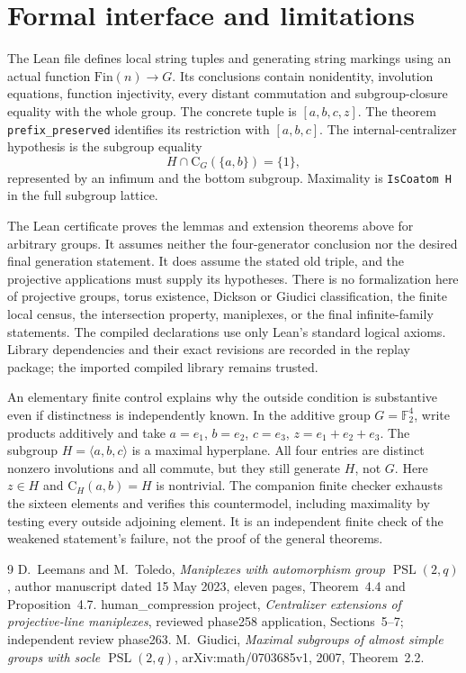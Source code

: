 \documentclass[11pt]{article}
\newcommand{\gen}[1]{\langle #1\rangle}
\newcommand{\CG}{\mathrm C}
\begin{document}
\section{Formal interface and limitations}
The Lean file defines local string tuples and generating string markings
using an actual function $\mathrm{Fin}(n)\to G$. Its conclusions contain
nonidentity, involution equations, function injectivity, every distant
commutation and subgroup-closure equality with the whole group.
The concrete tuple is $[a,b,c,z]$. The theorem
\texttt{prefix\_preserved} identifies its restriction with $[a,b,c]$.
The internal-centralizer hypothesis is the subgroup equality
\[
 H\cap \CG_G(\{a,b\})=\{1\},
\]
represented by an infimum and the bottom subgroup. Maximality is
\texttt{IsCoatom H} in the full subgroup lattice.

The Lean certificate proves the lemmas and extension theorems above
for arbitrary groups. It assumes neither the four-generator conclusion
nor the desired final generation statement. It does assume the stated
old triple, and the projective applications must supply its hypotheses.
There is no formalization here of projective groups, torus existence,
Dickson or Giudici classification, the finite local census, the
intersection property, maniplexes, or the final infinite-family
statements. The compiled declarations use only Lean's standard logical
axioms. Library dependencies and their exact revisions are recorded in
the replay package; the imported compiled library remains trusted.

An elementary finite control explains why the outside condition is
substantive even if distinctness is independently known. In the additive
group $G=\mathbb F_2^4$, write products additively and take
$a=e_1$, $b=e_2$, $c=e_3$, $z=e_1+e_2+e_3$. The subgroup
$H=\gen{a,b,c}$ is a maximal hyperplane. All four entries are distinct
nonzero involutions and all commute, but they still generate $H$,
not $G$. Here $z\in H$ and $\CG_H(a,b)=H$ is nontrivial.
The companion finite checker exhausts the sixteen elements and verifies
this countermodel, including maximality by testing every outside
adjoining element. It is an independent finite check of the weakened
statement's failure, not the proof of the general theorems.

\begin{thebibliography}{9}
 D.~Leemans and M.~Toledo,
\emph{Maniplexes with automorphism group $\operatorname{PSL}(2,q)$},
author manuscript dated 15 May 2023, eleven pages,
Theorem~4.4 and Proposition~4.7.
 human\_compression project,
\emph{Centralizer extensions of projective-line maniplexes},
reviewed phase258 application, Sections~5--7; independent review phase263.
 M.~Giudici,
\emph{Maximal subgroups of almost simple groups with socle
$\operatorname{PSL}(2,q)$}, arXiv:math/0703685v1, 2007,
Theorem~2.2.
\end{thebibliography}
\end{document}
